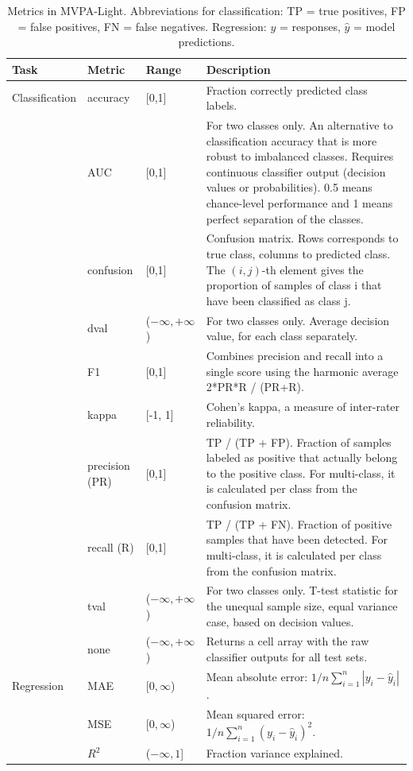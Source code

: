\documentclass[utf8]{frontiersSCNS} %
\begin{document}
\begin{table}[]
\begin{tabularx}{\textwidth}{lllX}
Task & Metric &  Range & Description   \\\hline
Classification & accuracy  &  [0,1] &  Fraction correctly predicted class labels.\\
 & AUC & [0,1] & For two classes only. An alternative to classification accuracy that is more robust to imbalanced classes. Requires continuous classifier output (decision values or probabilities). 0.5 means chance-level performance and 1 means perfect separation of the classes.\\
 & confusion & [0,1] &  Confusion matrix. Rows corresponds to true class, columns  to predicted class. The $(i,j)$-th element gives the proportion of samples of class i that have been classified as class j.\\
 &dval & ($-\infty,+\infty$) & For two classes only. Average decision value, for each class separately.\\
 &F1 & [0,1] & Combines precision and recall into a single score using the harmonic average 2*PR*R / (PR+R).\\
&kappa & [-1, 1] & Cohen's kappa, a measure of inter-rater reliability.\\
&precision (PR) & [0,1] & TP / (TP + FP). Fraction of samples labeled as positive that actually belong to the positive class. For multi-class, it is calculated per class from the confusion matrix.\\
&recall (R) & [0,1] & TP / (TP + FN). Fraction of positive samples that have been detected. For multi-class, it is calculated per class from the confusion matrix.\\
&tval & ($-\infty,+\infty$) & For two classes only. T-test statistic for the unequal sample size, equal variance case, based on decision values.\\
&none & ($-\infty,+\infty$) & Returns a cell array with the raw classifier outputs for all test sets.\\\hline
Regression & MAE  & [$0,\infty$) &  Mean absolute error: $1/n \sum_{i=1}^n|y_i - \hat{y}_i|$.\\
& MSE  & [$0,\infty$) &  Mean squared error: $1/n \sum_{i=1}^n(y_i - \hat{y}_i)^2$.\\
& $R^2$  & ($-\infty,1$] &  Fraction variance explained.\\
\hline
\end{tabularx}
\caption{Metrics in MVPA-Light. Abbreviations for classification: TP = true positives, FP = false positives, FN = false negatives. Regression: $y$ = responses, $\hat{y}$ = model predictions.}
\label{tab:metrics}
\end{table}
\end{document}
